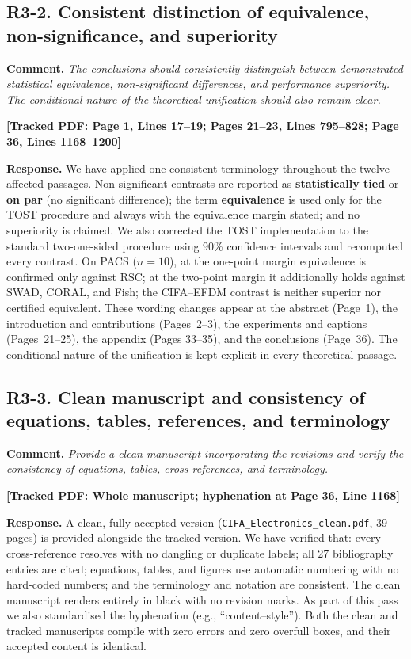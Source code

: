 \documentclass[11pt]{article}
\newcommand{\loc}[1]{\textbf{[\textcolor{revblue}{Tracked PDF: #1}]}}
\begin{document}
\subsection*{R3-2. Consistent distinction of equivalence, non-significance, and superiority}

\textbf{Comment.} \textit{The conclusions should consistently distinguish
between demonstrated statistical equivalence, non-significant differences, and
performance superiority. The conditional nature of the theoretical unification
should also remain clear.}

\loc{Page 1, Lines 17--19; Pages 21--23, Lines 795--828; Page 36,
Lines 1168--1200}

\textbf{Response.} We have applied one consistent terminology throughout the
twelve affected passages. Non-significant contrasts are reported as
\textbf{statistically tied} or \textbf{on par} (no significant difference);
the term \textbf{equivalence} is used only for the TOST procedure and always
with the equivalence margin stated; and no superiority is claimed. We also
corrected the TOST implementation to the standard two-one-sided procedure
using 90\% confidence intervals and recomputed every contrast. On PACS
($n=10$), at the one-point margin equivalence is confirmed only against RSC;
at the two-point margin it additionally holds against SWAD, CORAL, and Fish;
the CIFA--EFDM contrast is neither superior nor certified equivalent. These
wording changes appear at the abstract (Page~1), the introduction and
contributions (Pages~2--3), the experiments and captions (Pages~21--25), the
appendix (Pages 33--35), and the conclusions (Page~36). The conditional nature
of the unification is kept explicit in every theoretical passage.

\subsection*{R3-3. Clean manuscript and consistency of equations, tables, references, and terminology}

\textbf{Comment.} \textit{Provide a clean manuscript incorporating the
revisions and verify the consistency of equations, tables, cross-references,
and terminology.}

\loc{Whole manuscript; hyphenation at Page 36, Line 1168}

\textbf{Response.} A clean, fully accepted version
(\texttt{CIFA\_Electronics\_clean.pdf}, 39 pages) is provided alongside the
tracked version. We have verified that: every cross-reference resolves with no
dangling or duplicate labels; all 27 bibliography entries are cited; equations,
tables, and figures use automatic numbering with no hard-coded numbers; and the
terminology and notation are consistent. The clean manuscript renders entirely
in black with no revision marks. As part of this pass we also standardised the
hyphenation (e.g., ``content--style''). Both the clean and tracked manuscripts
compile with zero errors and zero overfull boxes, and their accepted content is
identical.
\end{document}
